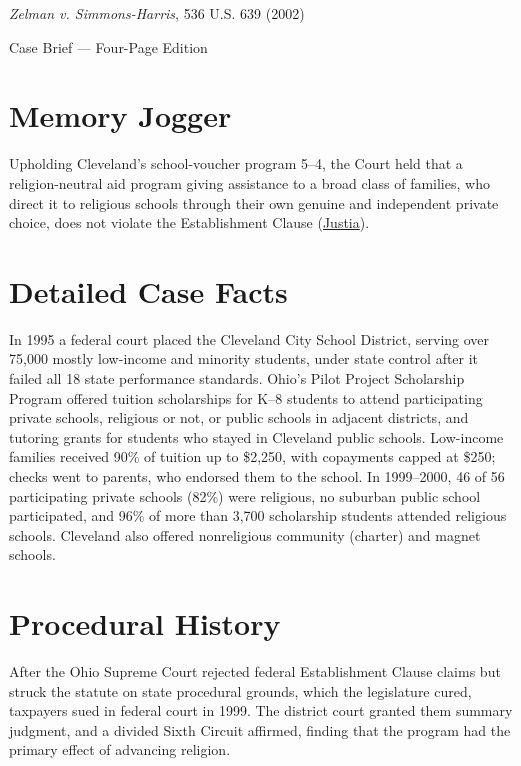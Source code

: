 \documentclass[12pt]{article}
\begin{document}
\begin{center}
{\LARGE \textit{Zelman v. Simmons-Harris}, 536 U.S. 639 (2002)\par}
\vspace{0.8em}
{\large Case Brief --- Four-Page Edition\par}
\end{center}
\vspace{1em}

\section{Memory Jogger}

Upholding Cleveland's school-voucher program 5--4, the Court held that a religion-neutral aid program giving assistance to a broad class of families, who direct it to religious schools through their own genuine and independent private choice, does not violate the Establishment Clause (\href{https://supreme.justia.com/cases/federal/us/536/639/}{Justia}).

\section{Detailed Case Facts}

In 1995 a federal court placed the Cleveland City School District, serving over 75,000 mostly low-income and minority students, under state control after it failed all 18 state performance standards. Ohio's Pilot Project Scholarship Program offered tuition scholarships for K--8 students to attend participating private schools, religious or not, or public schools in adjacent districts, and tutoring grants for students who stayed in Cleveland public schools. Low-income families received 90\% of tuition up to \$2,250, with copayments capped at \$250; checks went to parents, who endorsed them to the school. In 1999--2000, 46 of 56 participating private schools (82\%) were religious, no suburban public school participated, and 96\% of more than 3,700 scholarship students attended religious schools. Cleveland also offered nonreligious community (charter) and magnet schools.

\section{Procedural History}

After the Ohio Supreme Court rejected federal Establishment Clause claims but struck the statute on state procedural grounds, which the legislature cured, taxpayers sued in federal court in 1999. The district court granted them summary judgment, and a divided Sixth Circuit affirmed, finding that the program had the primary effect of advancing religion.
\end{document}
